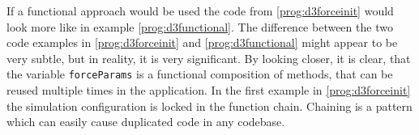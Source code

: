 If a functional approach would be used the code from \ref{prog:d3forceinit} would look more like in example \ref{prog:d3functional}. The difference between the two code examples in \ref{prog:d3forceinit} and \ref{prog:d3functional} might appear to be very subtle, but in reality, it is very significant. By looking closer, it is clear, that the variable \texttt{forceParams} is a functional composition of methods, that can be reused multiple times in the application. In the first example in \ref{prog:d3forceinit} the simulation configuration is locked in the function chain. Chaining is a pattern which can easily cause duplicated code in any codebase.

%
